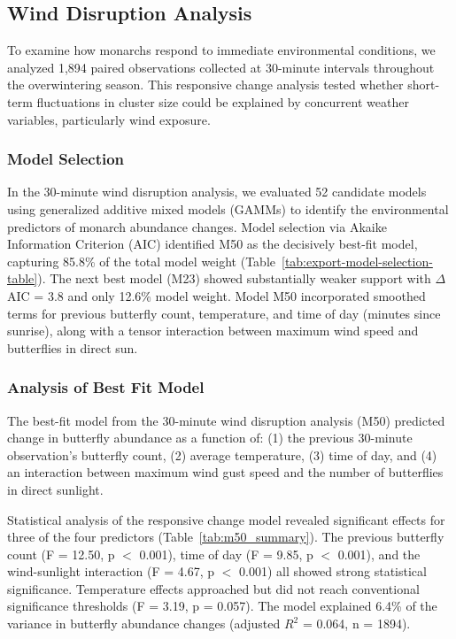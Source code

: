 \subsection{Wind Disruption Analysis}

To examine how monarchs respond to immediate environmental conditions, we analyzed 1,894 paired observations collected at 30-minute intervals throughout the overwintering season. This responsive change analysis tested whether short-term fluctuations in cluster size could be explained by concurrent weather variables, particularly wind exposure.

\subsubsection{Model Selection}

In the 30-minute wind disruption analysis, we evaluated 52 candidate models using generalized additive mixed models (GAMMs) to identify the environmental predictors of monarch abundance changes. Model selection via Akaike Information Criterion (AIC) identified M50 as the decisively best-fit model, capturing 85.8\% of the total model weight (Table~\ref{tab:export-model-selection-table}). The next best model (M23) showed substantially weaker support with $\Delta$AIC = 3.8 and only 12.6\% model weight. Model M50 incorporated smoothed terms for previous butterfly count, temperature, and time of day (minutes since sunrise), along with a tensor interaction between maximum wind speed and butterflies in direct sun.

 

\subsubsection{Analysis of Best Fit Model}

The best-fit model from the 30-minute wind disruption analysis (M50) predicted change in butterfly abundance as a function of: (1) the previous 30-minute observation's butterfly count, (2) average temperature, (3) time of day, and (4) an interaction between maximum wind gust speed and the number of butterflies in direct sunlight.

Statistical analysis of the responsive change model revealed significant effects for three of the four predictors (Table~\ref{tab:m50_summary}). The previous butterfly count (F = 12.50, p $<$ 0.001), time of day (F = 9.85, p $<$ 0.001), and the wind-sunlight interaction (F = 4.67, p $<$ 0.001) all showed strong statistical significance. Temperature effects approached but did not reach conventional significance thresholds (F = 3.19, p = 0.057). The model explained 6.4\% of the variance in butterfly abundance changes (adjusted $R^2$ = 0.064, n = 1894).

